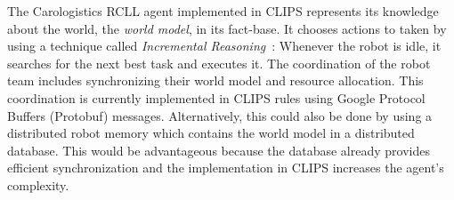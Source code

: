 \documentclass[a4paper,11pt]{article}
\begin{document}
The Carologistics RCLL agent implemented in CLIPS represents its
knowledge about the world, the \emph{world model}, in its
fact-base. It chooses actions to taken by using a
technique called \emph{Incremental Reasoning}~\cite{CLIPS-Agent}:
Whenever the robot is idle, it searches for the
next best task and executes it.
The coordination
of the robot team includes synchronizing their world model
and resource allocation.
This coordination is currently implemented in CLIPS
rules using Google Protocol Buffers (Protobuf)
messages. Alternatively, this could also be done by using a
distributed robot memory which contains the world model in a
distributed database. This would be advantageous
because the database already provides efficient synchronization and
the implementation in CLIPS increases the agent's complexity.
\end{document}
